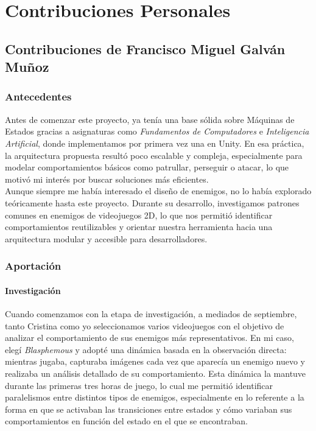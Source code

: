 \chapter*{Contribuciones Personales}
\label{cap:contribucionesPersonales}

\section*{Contribuciones de Francisco Miguel Galván Muñoz}
\subsection*{Antecedentes}
Antes de comenzar este proyecto, ya tenía una base sólida sobre Máquinas de Estados gracias a asignaturas como \textit{Fundamentos de Computadores} e \textit{Inteligencia Artificial}, donde implementamos por primera vez una en Unity. En esa práctica, la arquitectura propuesta resultó poco escalable y compleja, especialmente para modelar comportamientos básicos como patrullar, perseguir o atacar, lo que motivó mi interés por buscar soluciones más eficientes.\\

Aunque siempre me había interesado el diseño de enemigos, no lo había explorado teóricamente hasta este proyecto. Durante su desarrollo, investigamos patrones comunes en enemigos de videojuegos 2D, lo que nos permitió identificar comportamientos reutilizables y orientar nuestra herramienta hacia una arquitectura modular y accesible para desarrolladores.\\
 
\subsection*{Aportación}
\subsubsection*{Investigación}
Cuando comenzamos con la etapa de investigación, a mediados de septiembre, tanto Cristina como yo seleccionamos varios videojuegos con el objetivo de analizar el comportamiento de sus enemigos más representativos. En mi caso, elegí \textit{Blasphemous} y adopté una dinámica basada en la observación directa: mientras jugaba, capturaba imágenes cada vez que aparecía un enemigo nuevo y realizaba un análisis detallado de su comportamiento. Esta dinámica la mantuve durante las primeras tres horas de juego, lo cual me permitió identificar paralelismos entre distintos tipos de enemigos, especialmente en lo referente a la forma en que se activaban las transiciones entre estados y cómo variaban sus comportamientos en función del estado en el que se encontraban.\\


